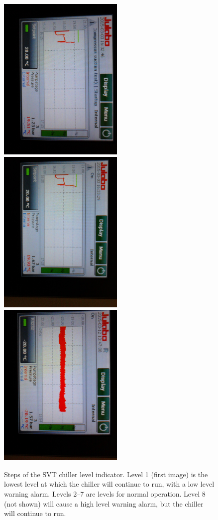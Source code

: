 \begin{figure}
    \includegraphics[angle=90,width=6cm]{figures/chiller_level5}
    \includegraphics[angle=90,width=6cm]{figures/chiller_level6}
    \includegraphics[angle=90,width=6cm]{figures/chiller_level7}
    \caption{Steps of the SVT chiller level indicator. Level 1 (first image) is the lowest level at which the chiller will continue to run, with a low level warning alarm. Levels 2--7 are levels for normal operation. Level 8 (not shown) will cause a high level warning alarm, but the chiller will continue to run. \label{fig:svt_chiller_level}}
\end{figure}

